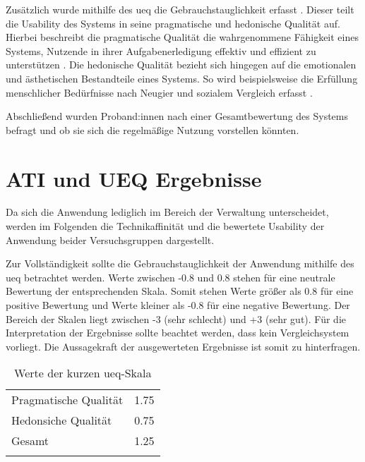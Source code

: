 Zusätzlich wurde mithilfe des \ac{ueq} die Gebrauchstauglichkeit erfasst
\cite{burghardt_mensch_2018}. Dieser teilt die Usability des Systems in seine pragmatische und
hedonische Qualität auf. Hierbei beschreibt die pragmatische Qualität die wahrgenommene Fähigkeit
eines Systems, Nutzende in ihrer Aufgabenerledigung effektiv und effizient zu unterstützen
\cite{hassenzahl_thing_2004}. Die hedonische Qualität bezieht sich hingegen auf die emotionalen und
ästhetischen Bestandteile eines Systems. So wird beispielsweise die Erfüllung menschlicher
Bedürfnisse nach Neugier und sozialem Vergleich erfasst \cite{hassenzahl_thing_2004}.

Abschließend wurden Proband:innen nach einer Gesamtbewertung des Systems befragt und ob sie sich die
regelmäßige Nutzung vorstellen könnten.



\section{ATI und UEQ Ergebnisse}
\label{sec:prese}
Da sich die Anwendung lediglich im Bereich der Verwaltung unterscheidet, werden im
Folgenden die Technikaffinität und die bewertete Usability der Anwendung beider
Versuchsgruppen dargestellt.

Zur Vollständigkeit sollte die Gebrauchstauglichkeit der Anwendung mithilfe des \ac{ueq} betrachtet
werden. Werte zwischen -0.8 und 0.8 stehen für eine neutrale Bewertung der entsprechenden Skala.
Somit stehen Werte größer als 0.8 für eine positive Bewertung und Werte kleiner als -0.8 für eine
negative Bewertung. Der Bereich der Skalen liegt zwischen -3 (sehr schlecht) und +3 (sehr gut). Für
die Interpretation der Ergebnisse sollte beachtet werden, dass kein Vergleichsystem vorliegt. Die
Aussagekraft der ausgewerteten Ergebnisse ist somit zu hinterfragen.
\begin{table}[h]
        \centering
        \caption{Werte der kurzen \ac{ueq}-Skala}
        \begin{tabular}{lc}
                \arrayrulecolor{maincolor}\hline
                Pragmatische Qualität & 1.75 \\
                Hedonsiche Qualität   & 0.75 \\
                Gesamt                & 1.25 \\
                \arrayrulecolor{maincolor}\hline
        \end{tabular}
        \label{table:ueq}
\end{table}

